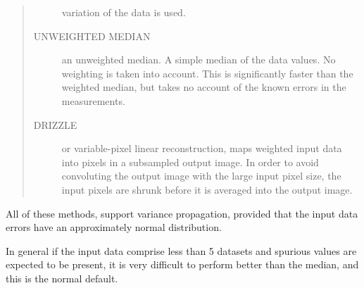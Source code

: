 \documentclass[twoside,11pt]{article}
\renewcommand{\_}{\texttt{\symbol{95}}}
\newenvironment{myquote}{\begin{quote}\begin{small}}{\end{small}\end{quote}}
\begin{document}
\begin{myquote}
\begin{description}
variation of the data is used.
\item[UNWEIGHTED MEDIAN] an unweighted median. A simple median of the 
data values. No weighting is taken into account. This is significantly 
faster than the weighted median, but takes no account of the known
errors in the measurements.
\item[DRIZZLE]  or variable-pixel linear reconstruction, maps weighted
input data into pixels in a subsampled output image. In order to avoid
convoluting the output image with the large input pixel size, the input
pixels are shrunk before it is averaged into the output image.
\end{description}
\end{myquote}

All of these methods, support variance propagation, 
provided that the input data errors have an approximately normal distribution.

In general if the input data comprise less than 5 datasets and spurious
values are expected to be present, it is very difficult to perform
better than the median, and this is the normal default.
\end{document}

